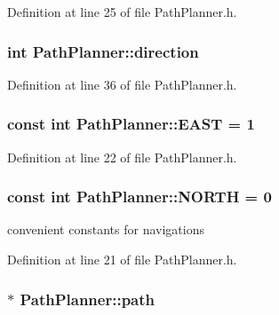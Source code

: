 Definition at line 25 of file Path\-Planner.\-h.

\hypertarget{classPathPlanner_a1f9985b79ca49ca0b2992176a10a6210}{
\subsubsection[{direction}]{\setlength{\rightskip}{0pt plus 5cm}int Path\-Planner\-::direction\hspace{0.3cm}{\ttfamily [private]}}}\label{classPathPlanner_a1f9985b79ca49ca0b2992176a10a6210}


Definition at line 36 of file Path\-Planner.\-h.

\hypertarget{classPathPlanner_a45399b95a063acdff309e376ccac0fa2}{
\subsubsection[{E\-A\-S\-T}]{\setlength{\rightskip}{0pt plus 5cm}const int Path\-Planner\-::\-E\-A\-S\-T = 1\hspace{0.3cm}{\ttfamily [static]}}}\label{classPathPlanner_a45399b95a063acdff309e376ccac0fa2}


Definition at line 22 of file Path\-Planner.\-h.

\hypertarget{classPathPlanner_a701384da34d065d821a936893c5ddd8d}{
\subsubsection[{N\-O\-R\-T\-H}]{\setlength{\rightskip}{0pt plus 5cm}const int Path\-Planner\-::\-N\-O\-R\-T\-H = 0\hspace{0.3cm}{\ttfamily [static]}}}\label{classPathPlanner_a701384da34d065d821a936893c5ddd8d}


convenient constants for navigations 



Definition at line 21 of file Path\-Planner.\-h.

\hypertarget{classPathPlanner_a9b41e5ee68a78a45e46003102a6c3b91}{
\subsubsection[{path}]{$\ast$ Path\-Planner\-::path\hspace{0.3cm}{\ttfamily [private]}}}\label{classPathPlanner_a9b41e5ee68a78a45e46003102a6c3b91}


